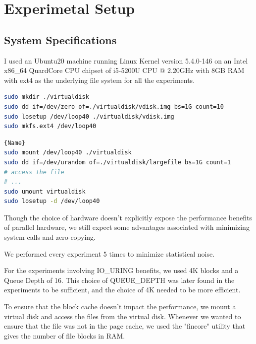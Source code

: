 \documentclass{article}
\begin{document}
\section{Experimetal Setup}
\subsection{System Specifications}
I used an Ubuntu20 machine running Linux Kernel version 5.4.0-146 on an Intel x86\_64 QuardCore CPU chipset of 
i5-5200U CPU @ 2.20GHz with 8GB RAM with ext4 as the underlying file system for all the experiments.

\noindent\begin{minipage}{.45\textwidth}
    \begin{lstlisting}[language=Bash, caption=Create a Virtual disk, basicstyle=\tiny]
sudo mkdir ./virtualdisk
sudo dd if=/dev/zero of=./virtualdisk/vdisk.img bs=1G count=10
sudo losetup /dev/loop40 ./virtualdisk/vdisk.img
sudo mkfs.ext4 /dev/loop40 
    \end{lstlisting}
    \end{minipage}\hfill
    \begin{minipage}{.45\textwidth}
    \begin{lstlisting}[language=Bash, caption=mount and unmount when using,frame=tlrb, basicstyle=\tiny]{Name}
sudo mount /dev/loop40 ./virtualdisk
sudo dd if=/dev/urandom of=./virtualdisk/largefile bs=1G count=1
# access the file
# ...
sudo umount virtualdisk
sudo losetup -d /dev/loop40
    \end{lstlisting}
    \end{minipage}

Though the choice of hardware doesn't explicitly expose the performance benefits of parallel hardware, we still expect some 
advantages associated with minimizing system calls and zero-copying.

We performed every experiment 5 times to minimize statistical noise.


For the experiments involving IO\_URING benefits, we used 4K blocks and a Queue Depth of 16. This choice of QUEUE\_DEPTH was 
later found in the experiments to be sufficient, and the choice of 4K needed to be more efficient. 

To ensure that the block cache doesn't impact the performance, we mount a virtual disk and access the files from the virtual disk. 
Whenever we wanted to ensure that the file was not in the page cache, we used the "fincore" utility that gives the number of 
file blocks in RAM.
\end{document}
